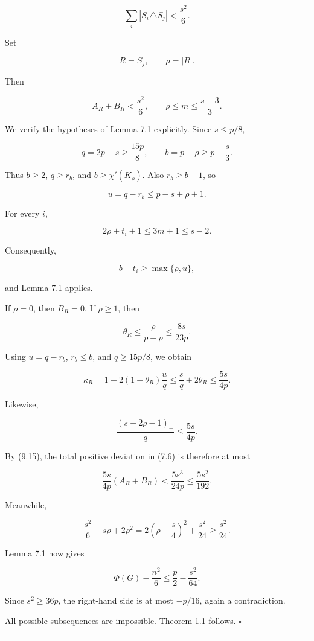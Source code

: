 \documentclass[
  11pt,
]{article}
\begin{document}
\[
\sum_i|S_i\triangle S_j|
<
\frac{s^2}{6}.
\tag{9.14}
\]

Set

\[
R=S_j,
\qquad
\rho=|R|.
\]

Then

\[
A_R+B_R<\frac{s^2}{6},
\qquad
\rho\le m\le\frac{s-3}{3}.
\tag{9.15}
\]

We verify the hypotheses of Lemma 7.1 explicitly. Since \(s\le p/8\),

\[
q=2p-s\ge\frac{15p}{8},
\qquad
b=p-\rho\ge p-\frac s3.
\]

Thus \(b\ge2\), \(q\ge r_b\), and \(b\ge\chi'(K_\rho)\). Also
\(r_b\ge b-1\), so

\[
u=q-r_b\le p-s+\rho+1.
\]

For every \(i\),

\[
2\rho+t_i+1
\le
3m+1
\le
s-2.
\]

Consequently,

\[
b-t_i\ge\max\{\rho,u\},
\]

and Lemma 7.1 applies.

If \(\rho=0\), then \(B_R=0\). If \(\rho\ge1\), then

\[
\theta_R
\le
\frac{\rho}{p-\rho}
\le
\frac{8s}{23p}.
\]

Using \(u=q-r_b\), \(r_b\le b\), and \(q\ge15p/8\), we obtain

\[
\kappa_R
=1-2(1-\theta_R)\frac uq
\le
\frac sq+2\theta_R
\le
\frac{5s}{4p}.
\tag{9.16}
\]

Likewise,

\[
\frac{(s-2\rho-1)_+}{q}
\le
\frac{5s}{4p}.
\tag{9.17}
\]

By (9.15), the total positive deviation in (7.6) is therefore at most

\[
\frac{5s}{4p}(A_R+B_R)
<
\frac{5s^3}{24p}
\le
\frac{5s^2}{192}.
\tag{9.18}
\]

Meanwhile,

\[
\frac{s^2}{6}-s\rho+2\rho^2
=
2\left(\rho-\frac s4\right)^2+\frac{s^2}{24}
\ge
\frac{s^2}{24}.
\tag{9.19}
\]

Lemma 7.1 now gives

\[
\Phi(G)-\frac{n^2}{6}
\le
\frac p2-\frac{s^2}{64}.
\tag{9.20}
\]

Since \(s^2\ge36p\), the right-hand side is at most \(-p/16\), again a
contradiction.

All possible subsequences are impossible. Theorem 1.1 follows.
\(\square\)

\begin{center}\rule{0.5\linewidth}{0.5pt}\end{center}
\end{document}
